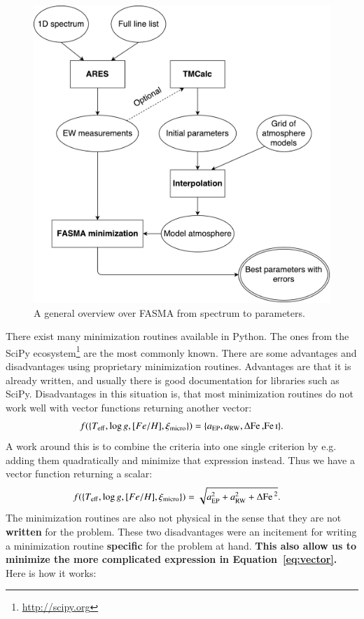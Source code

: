 \documentclass{aa}
\begin{document}
\begin{figure}[tpb]
    \centering
    \includegraphics[width=1.0\linewidth,natwidth=700,natheight=650]{figures/FASMA_general.pdf}
    \caption{A general overview over FASMA from spectrum to parameters.}
    \label{fig:FASMA_general}
\end{figure}

There exist many minimization routines available in Python. The ones from the
SciPy ecosystem\footnote{\url{http://scipy.org}} are the most commonly known.
There are some advantages and disadvantages using proprietary minimization
routines. Advantages are that it is already written, and usually there is good
documentation for libraries such as SciPy. Disadvantages in this situation is,
that most minimization routines do not work well with vector functions returning
another vector:
\begin{align}
    f(\{T_\mathrm{eff}, \log g, [Fe/H], \xi_\mathrm{micro}\}) = \{a_\mathrm{EP}, a_\mathrm{RW}, \Delta\ion{Fe}, \ion{Fe}{I}\}. \label{eq:vector}
\end{align}
A work around this is to combine the criteria into one single criterion by e.g.
adding them quadratically and minimize that expression instead. Thus we have a
vector function returning a scalar:
\begin{align}
    f(\{T_\mathrm{eff}, \log g, [Fe/H], \xi_\mathrm{micro}\}) &= \sqrt{a_\mathrm{EP}^2 + a_\mathrm{RW}^2 + \Delta\ion{Fe}{}^2}. \label{eq:scalar}
\end{align}
The minimization routines are also not physical in the sense that they are not
{\bf written} for the problem. These two disadvantages were an incitement for
writing a minimization routine {\bf specific} for the problem at hand. {\bf This
also allow us to minimize the more complicated expression in Equation~\ref{eq:vector}.}
Here is how it works:
\end{document}
